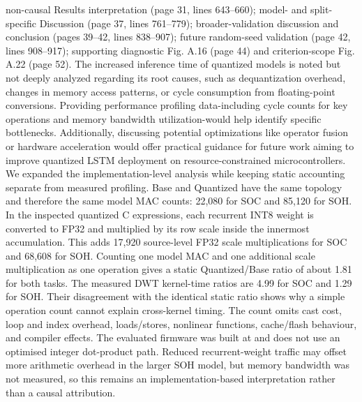 {} non-causal Results interpretation (page 31, lines 643--660); model- and split-specific Discussion (page 37, lines 761--779); broader-validation discussion and conclusion (pages 39--42, lines 838--907); future random-seed validation (page 42, lines 908--917); supporting diagnostic Fig. A.16 (page 44) and criterion-scope Fig. A.22 (page 52).\markdownRendererInterblockSeparator
{}
\markdownRendererSectionEnd \markdownRendererSectionBegin
{}\markdownRendererInterblockSeparator
{}\markdownRendererBlockQuoteBegin
The increased inference time of quantized models is noted but not deeply analyzed regarding its root causes, such as dequantization overhead, changes in memory access patterns, or cycle consumption from floating-point conversions. Providing performance profiling data-including cycle counts for key operations and memory bandwidth utilization-would help identify specific bottlenecks. Additionally, discussing potential optimizations like operator fusion or hardware acceleration would offer practical guidance for future work aiming to improve quantized LSTM deployment on resource-constrained microcontrollers.\markdownRendererBlockQuoteEnd \markdownRendererInterblockSeparator
{} We expanded the implementation-level analysis while keeping static accounting separate from measured profiling. Base and Quantized have the same topology and therefore the same model MAC counts: 22,080 for SOC and 85,120 for SOH. In the inspected quantized C expressions, each recurrent INT8 weight is converted to FP32 and multiplied by its row scale inside the innermost accumulation. This adds 17,920 source-level FP32 scale multiplications for SOC and 68,608 for SOH. Counting one model MAC and one additional scale multiplication as one operation gives a static Quantized/Base ratio of about 1.81 for both tasks.\markdownRendererParagraphSeparator
{}The measured DWT kernel-time ratios are 4.99 for SOC and 1.29 for SOH. Their disagreement with the identical static ratio shows why a simple operation count cannot explain cross-kernel timing. The count omits cast cost, loop and index overhead, loads/stores, nonlinear functions, cache/flash behaviour, and compiler effects. The evaluated firmware was built at  and does not use an optimised integer dot-product path. Reduced recurrent-weight traffic may offset more arithmetic overhead in the larger SOH model, but memory bandwidth was not measured, so this remains an implementation-based interpretation rather than a causal attribution.\markdownRendererParagraphSeparator
